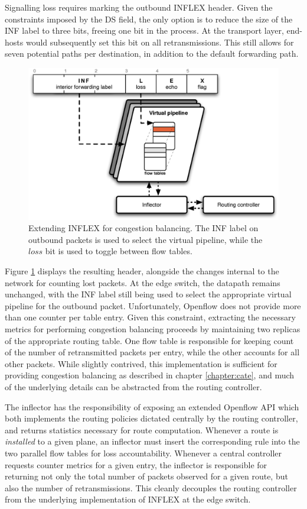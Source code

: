 Signalling loss requires marking the outbound INFLEX header.
Given the constraints imposed by the \ac{DS} field, the only option is to reduce the size of the \ac{INF} label to three bits, freeing one bit in the process.
At the transport layer, end-hosts would subsequently set this bit on all retransmissions.
This still allows for seven potential paths per destination, in addition to the default forwarding path.

\begin{figure}
    \centering
    \includegraphics[width=0.7\linewidth]{figures/inflex/infloss}
    \caption[Extending INFLEX for congestion balancing.]{Extending INFLEX for congestion balancing. The \ac{INF} label on outbound packets is used to select the virtual pipeline, while the $loss$ bit is used to toggle between flow tables.\label{fig:inflexloss}}
\end{figure}

Figure \ref{fig:inflexloss} displays the resulting header, alongside the changes internal to the network for counting lost packets.
At the edge switch, the datapath remains unchanged, with the \ac{INF} label still being used to select the appropriate virtual pipeline for the outbound packet.
Unfortunately, Openflow does not provide more than one counter per table entry.
Given this constraint, extracting the necessary metrics for performing congestion balancing proceeds by maintaining two replicas of the appropriate routing table.
One flow table is responsible for keeping count of the number of retransmitted packets per entry, while the other accounts for all other packets.
While slightly contrived, this implementation is sufficient for providing congestion balancing as described in chapter \ref{chapter:cate}, and much of the underlying details can be abstracted from the routing controller.

The inflector has the responsibility of exposing an extended Openflow \ac{API} which both implements the routing policies dictated centrally by the routing controller, and returns statistics necessary for route computation.
Whenever a route is \emph{installed} to a given plane, an inflector must insert the corresponding rule into the two parallel flow tables for loss accountability.
Whenever a central controller requests counter metrics for a given entry, the inflector is responsible for returning not only the total number of packets observed for a given route, but also the number of retransmissions.
This cleanly decouples the routing controller from the underlying implementation of INFLEX at the edge switch.
